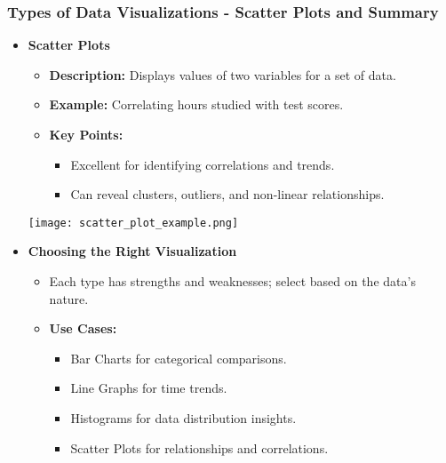 \documentclass[aspectratio=169]{beamer}
\begin{document}
\begin{frame}[fragile]
    \frametitle{Types of Data Visualizations - Scatter Plots and Summary}
    \begin{itemize}
        \item \textbf{Scatter Plots}
        \begin{itemize}
            \item \textbf{Description:} Displays values of two variables for a set of data.
            \item \textbf{Example:} Correlating hours studied with test scores.
            \item \textbf{Key Points:}
            \begin{itemize}
                \item Excellent for identifying correlations and trends.
                \item Can reveal clusters, outliers, and non-linear relationships.
            \end{itemize}
        \end{itemize}
        \texttt{[image: scatter\_plot\_example.png]}

        \vspace{1em}

        \item \textbf{Choosing the Right Visualization}
        \begin{itemize}
            \item Each type has strengths and weaknesses; select based on the data's nature.
            \item \textbf{Use Cases:}
            \begin{itemize}
                \item Bar Charts for categorical comparisons.
                \item Line Graphs for time trends.
                \item Histograms for data distribution insights.
                \item Scatter Plots for relationships and correlations.
            \end{itemize}
        \end{itemize}
    \end{itemize}
\end{frame}
\end{document}

